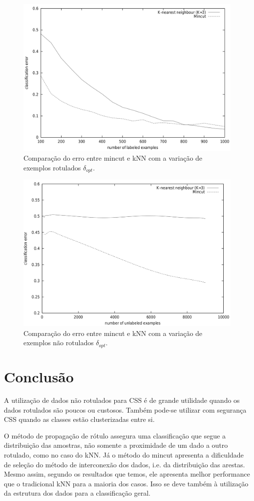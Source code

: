 \documentclass[12pt]{article}
\begin{document}
\begin{figure} \label{fig:mincut-l}
        \begin{center}
                \includegraphics[width=.45\textwidth]{mincut-erro-l}
        \end{center}
        \caption{Comparação do erro entre mincut e kNN com a variação de exemplos rotulados $\delta_{opt}$.}
\end{figure}

\begin{figure} \label{fig:mincut-l}
        \begin{center}
                \includegraphics[width=.45\textwidth]{mincut-erro-u}
        \end{center}
        \caption{Comparação do erro entre mincut e kNN com a variação de exemplos não rotulados $\delta_{opt}$.}
\end{figure}


\section{Conclusão}
A utilização de dados não rotulados para CSS é de grande utilidade quando os dados rotulados são poucos ou custosos. Também pode-se utilizar com segurança CSS quando as classes estão clusterizadas entre si.

O método de propagação de rótulo assegura uma classificação que segue a distribuição das amostras, não somente a proximidade de um dado a outro rotulado, como no caso do kNN. Já o método do mincut apresenta a dificuldade de seleção do método de interconexão dos dados, i.e. da distribuição das arestas. Mesmo assim, segundo os resultados que temos, ele apresenta melhor performance que o tradicional kNN para a maioria dos casos. Isso se deve também à utilização da estrutura dos dados para a classificação geral. 
\end{document}
